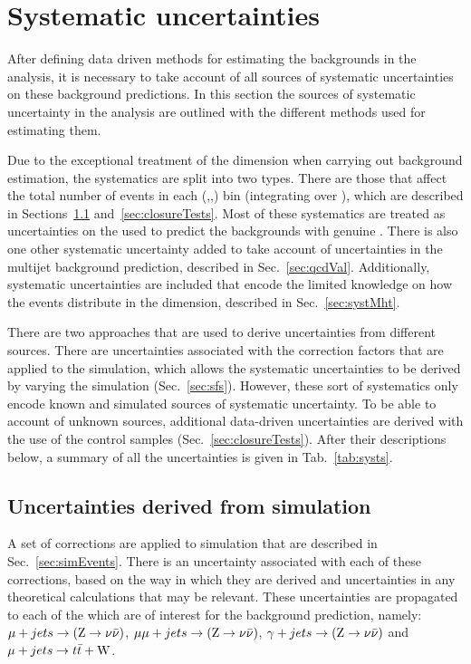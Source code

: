 \section{Systematic uncertainties} %
\label{sec:systematics}

After defining data driven methods for estimating the \SM backgrounds
in the analysis, it is necessary to take account of all sources of
systematic uncertainties on these background predictions. In this
section the sources of systematic uncertainty in the analysis are
outlined with the different methods used for estimating them.  

Due to the exceptional treatment of the \MHT dimension when carrying
out background estimation, the systematics are split into two types.
There are those that affect the total number of events in each
(\HT,\nj,\nb) bin (integrating over \MHT), which are described in
Sections~\ref{sec:simUnc} and~\ref{sec:closureTests}. Most of these
systematics are treated as uncertainties on the \TFs used to predict
the \SM backgrounds with genuine \MET. There is also one other
systematic uncertainty added to take account of uncertainties in the
\QCD multijet background prediction, described in
Sec.~\ref{sec:qcdVal}. Additionally, systematic uncertainties are
included that encode the limited knowledge on how the events
distribute in the \mht dimension, described in Sec.~\ref{sec:systMht}.

There are two approaches that are used to derive uncertainties
from different sources. There are uncertainties associated with the
correction factors that are applied to the simulation, which allows
the systematic uncertainties to be derived by varying the simulation (Sec.~\ref{sec:sfs}).
However, these sort of systematics only encode known and simulated
sources of systematic uncertainty. To be able to account of unknown
sources, additional data-driven uncertainties are derived with the
use of the control samples (Sec.~\ref{sec:closureTests}). After their
descriptions below, a summary of all the uncertainties is given in
Tab.~\ref{tab:systs}.

\subsection{Uncertainties derived from simulation}
\label{sec:simUnc}

A set of corrections are applied to simulation that are described in
Sec.~\ref{sec:simEvents}. There is an uncertainty associated with each
of these corrections, based on the way in which they are derived and
uncertainties in any theoretical calculations that may be relevant.
These uncertainties are propagated to each of the \TFs which are of
interest for the background prediction, namely: $\mu + jets \rightarrow
({\text Z} \rightarrow \nu\bar{\nu})$, $\mu\mu + jets \rightarrow ({\text Z} \rightarrow \nu\bar{\nu})$, $\gamma + jets \rightarrow ({\text Z} \rightarrow \nu\bar{\nu})$ and
$\mu + jets \rightarrow t\bar{t}+\mathrm{W}$. 


